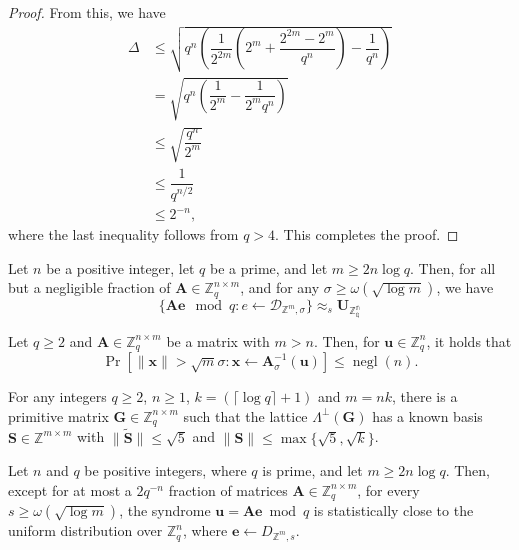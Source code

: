 \begin{proof}
From this, we have
$$
\begin{aligned}
\Delta
&\leq
\sqrt{
q^n
\left(
\dfrac{1}{2^{2m}}
\left(
2^m+\dfrac{2^{2m}-2^m}{q^n}
\right)
-
\dfrac{1}{q^n}
\right)
}
\\
&=
\sqrt{
q^n
\left(
\dfrac{1}{2^m}
-
\dfrac{1}{2^m q^n}
\right)
}
\\
&\leq
\sqrt{\dfrac{q^n}{2^m}}
\\
&\leq
\dfrac{1}{q^{n/2}}
\\
&\leq
2^{-n},
\end{aligned}
$$
where the last inequality follows from $q>4$. This completes the proof.
\end{proof}

\begin{lemma}
\label{lem:4}
Let $n$ be a positive integer, let $q$ be a prime, and let
$m \ge 2n\log q$. Then, for all but a negligible fraction of
$\mathbf{A} \in \mathbb{Z}_q^{n\times m}$, and for any
$\sigma \ge \omega(\sqrt{\log m})$, we have 
$$\{\mathbf{Ae} \mod q:e \leftarrow \mathcal{D}_{\mathbb{Z}^m,\sigma}\} \approx_s \mathbf{U}_\mathbb{Z_q^n}$$
\end{lemma}


\begin{lemma}
\label{lem:tail_bound}
Let $q \geq 2$ and $\mathbf{A} \in \mathbb{Z}_q^{n \times m}$ be a matrix
with $m > n$. Then, for $\mathbf{u} \in \mathbb{Z}_q^n$, it holds that
\[
    \Pr\left[
        \|\mathbf{x}\| > \sqrt{m}\sigma
        :
        \mathbf{x} \leftarrow \mathbf{A}_{\sigma}^{-1}(\mathbf{u})
    \right]
    \leq \operatorname{negl}(n).
\]
\end{lemma}

\begin{lemma}
\label{lem:gaget_matrix_sam}
For any integers $q \geq 2$, $n \geq 1$, $k = (\lceil \log q \rceil + 1)$ and $m = nk$, there is a primitive matrix
$\mathbf{G} \in \mathbb{Z}_q^{n \times m}$ such that the lattice $\Lambda^\perp(\mathbf{G})$ has a known basis $\mathbf{S} \in \mathbb{Z}^{m \times m}$ with $\|\widetilde{\mathbf{S}}\| \leq \sqrt{5}$ and $\|\mathbf{S}\| \leq \max\{\sqrt{5}, \sqrt{k}\}$.
\end{lemma}

\begin{lemma}
\label{lem:uniform_mul_gaussian}
Let $n$ and $q$ be positive integers, where $q$ is prime, and let
$m \geq 2n\log q$. Then, except for at most a $2q^{-n}$ fraction of
matrices $\mathbf{A} \in \mathbb{Z}_q^{n \times m}$, for every
$s \geq \omega(\sqrt{\log m})$, the syndrome
$
\mathbf{u} = \mathbf{A}\mathbf{e} \bmod q
$
is statistically close to the uniform distribution over $\mathbb{Z}_q^n$,
where $\mathbf{e} \leftarrow D_{\mathbb{Z}^m,s}$.
\end{lemma}

